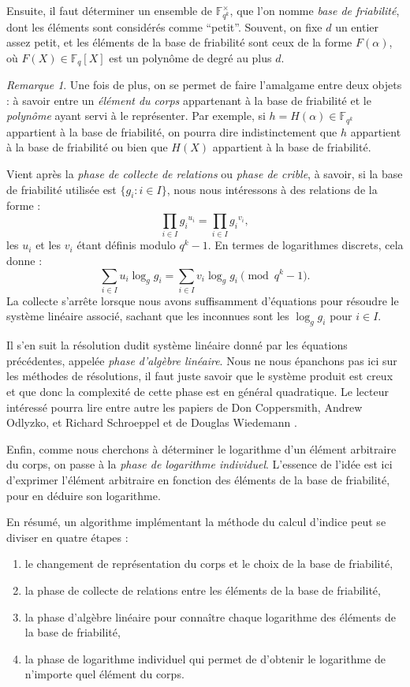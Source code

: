 \documentclass[a4paper, titlepage, 11pt]{article}
\theoremstyle{definition}
\theoremstyle{remark}
\newtheorem{rema}[theo]{Remarque}
\def\gf #1{\mathbb{F}_{#1}}
\begin{document}
Ensuite, il faut déterminer un ensemble de $\gf{q^k}^\times$, que l'on nomme \textit{base de friabilité}, dont les éléments sont considérés comme ``petit''. Souvent, on fixe $d$ un entier assez petit, et les éléments de la base de friabilité sont ceux de la forme $F(\alpha)$, où $F(X)\in\gf{q}[X]$ est un polynôme de degré au plus $d$.

\begin{rema}
Une fois de plus, on se permet de faire l'amalgame entre deux objets : à savoir entre un \textit{élément du corps} appartenant à la base de friabilité et le \textit{polynôme} ayant servi à le représenter. Par exemple, si $h = H(\alpha)\in\gf{q^k}$ appartient à la base de friabilité, on pourra dire indistinctement que $h$  appartient à la base de friabilité ou bien que $H(X)$ appartient à la base de friabilité.
\end{rema}

Vient après la \textit{phase de collecte de relations} ou \textit{phase de crible}, à savoir, si la base de friabilité utilisée est $\{g_i : i \in I\}$, nous nous intéressons à des relations de la forme :
$$\prod_{i\in I} {g_i}^{u_i} = \prod_{i\in I} {g_i}^{v_i},$$
les $u_i$ et les $v_i$ étant définis modulo $q^k-1$. En termes de logarithmes discrets, cela donne :
$$\sum_{i\in I} u_i \log_gg_i = \sum_{i\in I} v_i \log_gg_i \pmod{q^k-1}.$$
La collecte s’arrête lorsque nous avons suffisamment d'équations pour résoudre le système linéaire associé, sachant que les inconnues sont les $\log_gg_i$ pour  $i\in I$.

Il s'en suit la résolution dudit système linéaire donné par les équations précédentes, appelée \textit{phase d'algèbre linéaire}. Nous ne nous épanchons pas ici sur les méthodes de résolutions, il faut juste savoir que le système produit est creux et que donc la complexité de cette phase est en général quadratique. Le lecteur intéressé pourra lire entre autre les papiers de Don Coppersmith, Andrew Odlyzko, et Richard Schroeppel \cite{coppersmith1986} et de Douglas Wiedemann \cite{wiedemann1986}.

Enfin, comme nous cherchons à déterminer le logarithme d'un élément arbitraire du corps, on passe à la \textit{phase de logarithme individuel}. L'essence de l'idée est ici d'exprimer l'élément arbitraire en fonction des éléments de la base de friabilité, pour en déduire son logarithme.

En résumé, un algorithme implémentant la méthode du calcul d'indice peut se diviser en quatre étapes : \begin{enumerate}
\item le changement de représentation du corps et le choix de la base de friabilité,
\item la phase de collecte de relations entre les éléments de la base de friabilité,
\item la phase d'algèbre linéaire pour connaître chaque logarithme des éléments de la base de friabilité,
\item la phase de logarithme individuel qui permet de d'obtenir le logarithme de n’importe quel élément du corps.
\end{enumerate}
\end{document}
